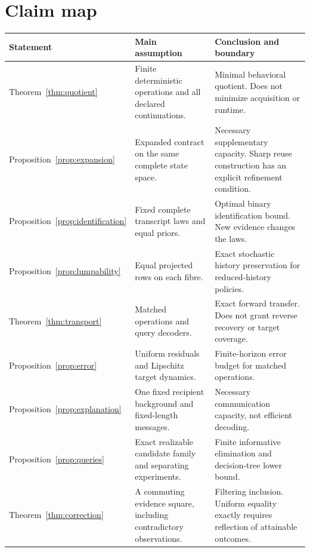 \documentclass[11pt,letterpaper]{article}
\theoremstyle{plain}
\theoremstyle{definition}
\begin{document}
\section{Claim map}\label{app:claims}
\begin{center}\small
\begin{tabularx}{\textwidth}{@{}P{1.1in}P{1.55in}X@{}}\toprule
Statement & Main assumption & Conclusion and boundary\\\midrule
Theorem~\ref{thm:quotient} & Finite deterministic operations and all declared continuations. & Minimal behavioral quotient. Does not minimize acquisition or runtime.\\
Proposition~\ref{prop:expansion} & Expanded contract on the same complete state space. & Necessary supplementary capacity. Sharp reuse construction has an explicit refinement condition.\\
Proposition~\ref{prop:identification} & Fixed complete transcript laws and equal priors. & Optimal binary identification bound. New evidence changes the laws.\\
Proposition~\ref{prop:lumpability} & Equal projected rows on each fibre. & Exact stochastic history preservation for reduced-history policies.\\
Theorem~\ref{thm:transport} & Matched operations and query decoders. & Exact forward transfer. Does not grant reverse recovery or target coverage.\\
Proposition~\ref{prop:error} & Uniform residuals and Lipschitz target dynamics. & Finite-horizon error budget for matched operations.\\
Proposition~\ref{prop:explanation} & One fixed recipient background and fixed-length messages. & Necessary communication capacity, not efficient decoding.\\
Proposition~\ref{prop:queries} & Exact realizable candidate family and separating experiments. & Finite informative elimination and decision-tree lower bound.\\
Theorem~\ref{thm:correction} & A commuting evidence square, including contradictory observations. & Filtering inclusion. Uniform equality exactly requires reflection of attainable outcomes.\\\bottomrule
\end{tabularx}\end{center}
\end{document}
